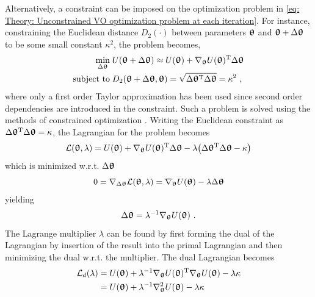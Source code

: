 Alternatively, a constraint can be imposed on the optimization problem in \eqref{eq: Theory: Unconstrained VO optimization problem at each iteration}. For instance, constraining the Euclidean distance $D_2(\cdot)$ between parameters ${\boldsymbol{\uptheta}}$ and ${\boldsymbol{\uptheta}}+\Delta{\boldsymbol{\uptheta}}$ to be some small constant $\kappa^2$, the problem becomes,
\begin{equation}\label{eq: Theory: Constrained VO optimization problem at each iteration (Euclidean dissimilarity)}
    \begin{aligned}
        \min_{\Delta{\boldsymbol{\uptheta}}} &\; U({\boldsymbol{\uptheta}}+\Delta{\boldsymbol{\uptheta}}) \approx U({\boldsymbol{\uptheta}}) + \nabla_{\boldsymbol{\uptheta}} U({\boldsymbol{\uptheta}}){^\mathrm{T}}\Delta{\boldsymbol{\uptheta}}\\
        \text{subject to} &\; D_2({\boldsymbol{\uptheta}}+\Delta{\boldsymbol{\uptheta}}, {\boldsymbol{\uptheta}}) = \sqrt{\Delta{\boldsymbol{\uptheta}}{^\mathrm{T}}\Delta{\boldsymbol{\uptheta}}} = \kappa^2 \ ,
    \end{aligned}
\end{equation}
where only a first order Taylor approximation has been used since second order dependencies are introduced in the constraint. Such a problem is solved using the methods of constrained optimization \cite{Nocedal2006}. Writing the Euclidean constraint as $\Delta{\boldsymbol{\uptheta}}{^\mathrm{T}}\Delta{\boldsymbol{\uptheta}} = \kappa$, the Lagrangian for the problem becomes
\begin{equation}
    \mathcal{L}({\boldsymbol{\uptheta}},\lambda) = U({\boldsymbol{\uptheta}}) + \nabla_{\boldsymbol{\uptheta}} U({\boldsymbol{\uptheta}}){^\mathrm{T}}\Delta{\boldsymbol{\uptheta}} - \lambda{\left(\Delta{\boldsymbol{\uptheta}}{^\mathrm{T}}\Delta{\boldsymbol{\uptheta}}- \kappa\right)}
\end{equation}
which is minimized w.r.t. $\Delta{\boldsymbol{\uptheta}}$
\begin{equation*}
    0 = \nabla_{\Delta{\boldsymbol{\uptheta}}}\mathcal{L}({\boldsymbol{\uptheta}},\lambda) = \nabla_{\boldsymbol{\uptheta}} U({\boldsymbol{\uptheta}}) - \lambda\Delta{\boldsymbol{\uptheta}}
\end{equation*}
yielding
\begin{equation}
    \Delta{\boldsymbol{\uptheta}} = \lambda^{-1}\nabla_{\boldsymbol{\uptheta}} U({\boldsymbol{\uptheta}}) \ .
\end{equation}
The Lagrange multiplier $\lambda$ can be found by first forming the dual of the Lagrangian by insertion of the result into the primal Lagrangian and then minimizing the dual w.r.t. the multiplier. The dual Lagrangian becomes
\begin{align}
    \mathcal{L}_d(\lambda)
    &= U({\boldsymbol{\uptheta}}) + \lambda^{-1}\nabla_{\boldsymbol{\uptheta}} U({\boldsymbol{\uptheta}}){^\mathrm{T}}\nabla_{\boldsymbol{\uptheta}} U({\boldsymbol{\uptheta}}) - \lambda\kappa\nonumber\\
    &= U({\boldsymbol{\uptheta}}) + \lambda^{-1}\nabla^2_{\boldsymbol{\uptheta}} U({\boldsymbol{\uptheta}}) - \lambda\kappa\nonumber
\end{align}
